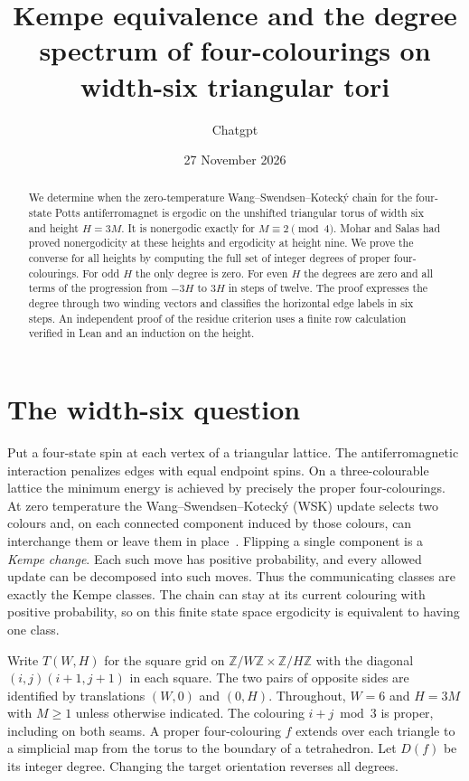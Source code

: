 \documentclass[11pt,a4paper]{article}
\title{Kempe equivalence and the degree spectrum of four-colourings on width-six triangular tori}
\author{Chatgpt}
\date{27 November 2026}
\newcommand{\Z}{\mathbb Z}
\begin{document}
\maketitle

\begin{abstract}
We determine when the zero-temperature Wang--Swendsen--Koteck\'y chain for the four-state Potts antiferromagnet is ergodic on the unshifted triangular torus of width six and height $H=3M$. It is nonergodic exactly for $M\equiv2\pmod4$. Mohar and Salas had proved nonergodicity at these heights and ergodicity at height nine. We prove the converse for all heights by computing the full set of integer degrees of proper four-colourings. For odd $H$ the only degree is zero. For even $H$ the degrees are zero and all terms of the progression from $-3H$ to $3H$ in steps of twelve. The proof expresses the degree through two winding vectors and classifies the horizontal edge labels in six steps. An independent proof of the residue criterion uses a finite row calculation verified in Lean and an induction on the height.
\end{abstract}

\section{The width-six question}

Put a four-state spin at each vertex of a triangular lattice. The antiferromagnetic interaction penalizes edges with equal endpoint spins. On a three-colourable lattice the minimum energy is achieved by precisely the proper four-colourings. At zero temperature the Wang--Swendsen--Koteck\'y (WSK) update selects two colours and, on each connected component induced by those colours, can interchange them or leave them in place~\cite{wsk,ms}. Flipping a single component is a \emph{Kempe change}. Each such move has positive probability, and every allowed update can be decomposed into such moves. Thus the communicating classes are exactly the Kempe classes. The chain can stay at its current colouring with positive probability, so on this finite state space ergodicity is equivalent to having one class.

Write $T(W,H)$ for the square grid on $\Z/W\Z\times\Z/H\Z$ with the diagonal $(i,j)(i+1,j+1)$ in each square. The two pairs of opposite sides are identified by translations $(W,0)$ and $(0,H)$. Throughout, $W=6$ and $H=3M$ with $M\ge1$ unless otherwise indicated. The colouring $i+j\bmod 3$ is proper, including on both seams. A proper four-colouring $f$ extends over each triangle to a simplicial map from the torus to the boundary of a tetrahedron. Let $D(f)$ be its integer degree. Changing the target orientation reverses all degrees.
\end{document}
